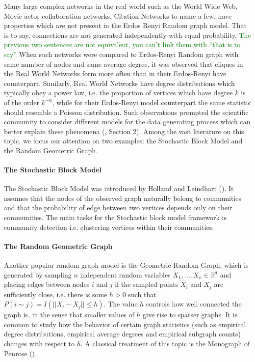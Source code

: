 \documentclass{article}
\newcommand\SB[1]{\textcolor{green}{#1}}
\begin{document}
Many large complex networks in the real world such as the World Wide Web, Movie
actor collaboration networks, Citation Networks to name a few, have properties
which are not present in the Erdos Renyi Random graph model. That is to say,
connections are not generated independently with equal probability. \SB{The
  previous two sentences are not equivalent, you can't link them with ``that is
  to say''} When such networks were compared
to Erdos-Renyi Random graph with same number of nodes and same average degree,
it was observed that cliques in the Real World Networks form more often than in
their Erdos-Renyi have counterpart. Similarly, Real World Networks have degree
distributions which typically obey a power law, i.e. the proportion of vertices
which have degree $k$ is of the order $k^{-\alpha}$, while for their Erdos-Renyi
model counterpart the same statistic should resemble a Poisson distribution.
Such observations prompted the scientific community to consider different models
for the data generating process which can better explain these phenomena
(\cite{Albert}, Section 2). Among the vast literature on this topic, we focus
our attention on two examples: the Stochastic Block Model and the Random
Geometric Graph.

\paragraph{The Stochastic Block Model} The Stochastic Block Model was introduced by Holland and Leindhart (\cite{Holland1983StochasticBF}). It assumes that the nodes of the observed graph naturally belong to communities and that the probability of edge between two vertices depends only on their communities. The main tasks for the Stochastic block model framework is community detection i.e. clustering vertices within their communities.

\paragraph{The Random Geometric Graph} Another popular random graph model is the Geometric Random Graph, which is generated by sampling $n$ independent random variables $X_1,...,X_n\in\mathbb{R}^d$ and placing edges between nodes $i$ and $j$ if the sampled points $X_i$ and $X_j$ are sufficiently close, i.e. there is some $h>0$ such that $P(i\sim j)=I(||X_i-X_j||\leq h)$. The value $h$ controls how well connected the graph is, in the sense that smaller values of $h$ give rise to sparser graphs. It is common to study how the behavior of certain graph statistics (such as empirical degree distributions, empirical average degrees and  empirical subgraph counts) changes with respect to $h$. A classical treatment of this topic is the Monograph of Penrose (\cite{Penrose2003RandomGG})
.
\end{document}
